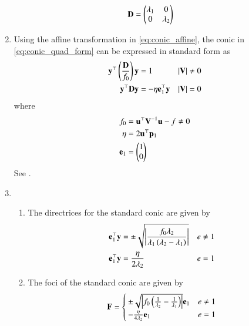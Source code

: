 \begin{enumerate}[label=\thesubsection.\arabic*.,ref=\thesubsection.\theenumi]
\begin{align}
      \label{eq:D}
	  \mathbf{D} &= \begin{pmatrix}\lambda_1 & 0 \\ 0 & \lambda_2\end{pmatrix}
\end{align}
			\item Using the affine transformation in
	\eqref{eq:conic_affine},
	the conic in     \eqref{eq:conic_quad_form} can be expressed in standard form 
	as
  \begin{align}
    \label{eq:conic_simp_temp_nonparab}
	    \mathbf{y}^{\top}\left(\frac{\mathbf{D}}{f_0}\right)\mathbf{y} &= 1   &  \left\vert\mathbf{V}\right\vert &\ne 0
    \\
	    \mathbf{y}^{\top}\mathbf{D}\mathbf{y} &=  -\eta\mathbf{e}_1^{\top}\mathbf{y}   & \left\vert\mathbf{V}\right\vert &= 0
    \label{eq:conic_simp_temp_parab}
    \end{align}
    where
  \begin{align}
      \label{eq:f0}
	  f_0 &=\mathbf{u}^{\top}\mathbf{V}^{-1}\mathbf{u} -f \ne 0
	  \\
      \label{eq:eta}
       \eta &=2\mathbf{u}^{\top}\mathbf{p}_1
       \\
       \mathbf{e}_1 &=\begin{pmatrix}1 \\ 0\end{pmatrix}
      \end{align}
  \solution  See .
	  
    \item\leavevmode
		\begin{enumerate}
			\item The directrices for the  standard conic are given by 
				\begin{align}
					\label{eq:dx-ell-hyp}
					\mathbf{e}_1^{\top}\mathbf{y} &=  
					\pm\sqrt{\left\vert\frac{f_0\lambda_2}{\lambda_1\left(\lambda_2-\lambda_1\right)}\right\vert} & e \ne 1
					\\
					\mathbf{e}_1^{\top}\mathbf{y} &= \frac{\eta}{2\lambda_2} & e = 1
					\label{eq:dx-parab}
				\end{align}
    \item The foci of the standard conic are given by 
				\begin{align}
					\label{eq:F-ell-hyp-parab}
					\mathbf{F} 
=
					\begin{cases}
						\pm \sqrt{\left\vert f_0\left(\frac{1}{\lambda_2}-\frac{1}{\lambda_1}\right)\right\vert}\mathbf{e}_1 & e \ne 1
						\\
						 -\frac{\eta}{4\lambda_2}\mathbf{e}_1 & e = 1
					\end{cases}
				\end{align}
	

\end{enumerate}
\end{enumerate}
